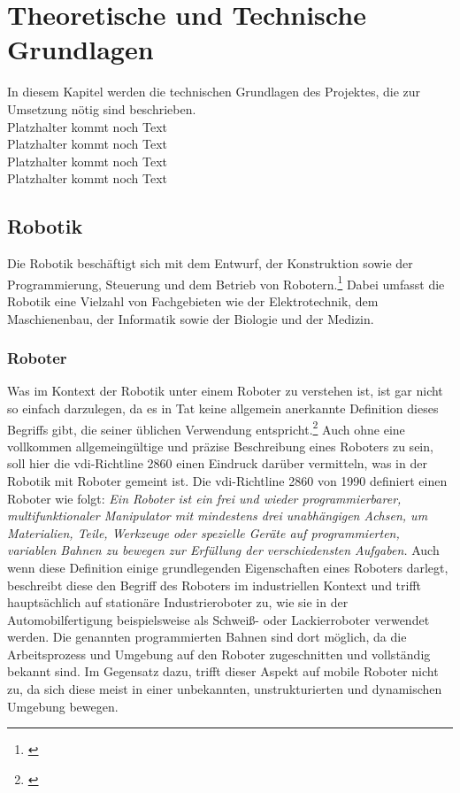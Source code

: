 \section{Theoretische und Technische Grundlagen}
In diesem Kapitel werden die technischen Grundlagen des Projektes, die zur Umsetzung nötig sind beschrieben.
\\Platzhalter kommt noch Text
\\Platzhalter kommt noch Text
\\Platzhalter kommt noch Text
\\Platzhalter kommt noch Text
\subsection{Robotik} %
Die Robotik beschäftigt sich mit dem Entwurf, der Konstruktion sowie der Programmierung, Steuerung und dem Betrieb 
von Robotern.\footnote{\citep[vgl.][Definition Robotik]{Bendel.DefinitionRobotik}\label{note1}} Dabei umfasst die Robotik eine Vielzahl 
von Fachgebieten wie der Elektrotechnik, dem Maschienenbau, der Informatik sowie der Biologie und der Medizin.
\subsubsection{Roboter}
Was im Kontext der Robotik unter einem Roboter zu verstehen ist, ist gar nicht so einfach darzulegen, da es in Tat keine allgemein anerkannte Definition dieses Begriffs gibt, die seiner üblichen Verwendung entspricht.\footnote{\citep[vgl.][Mobile Roboter, Seite 2]{Hertzberg.MobileRoboter}\label{note2}}
\newline
Auch ohne eine vollkommen allgemeingültige und präzise Beschreibung eines Roboters zu sein, soll hier die \gls{vdi}-Richtline 2860 einen Eindruck darüber vermitteln, was in der Robotik mit Roboter gemeint ist. \newline
Die \gls{vdi}-Richtline 2860 von 1990 definiert einen Roboter wie folgt:
\vspace{2mm}
\newline
\glqq{}\textit{Ein Roboter ist ein frei und wieder programmierbarer, multifunktionaler Manipulator mit mindestens drei unabhängigen Achsen, um Materialien, Teile, Werkzeuge oder spezielle Geräte auf programmierten,
variablen Bahnen zu bewegen zur Erfüllung der verschiedensten Aufgaben.}\grqq{}
\vspace{2mm}
\newline
Auch wenn diese Definition einige grundlegenden Eigenschaften eines Roboters darlegt, beschreibt diese den Begriff des Roboters im industriellen Kontext und trifft hauptsächlich auf stationäre Industrieroboter zu, wie sie in der Automobilfertigung beispielsweise als Schweiß- oder Lackierroboter verwendet werden. Die genannten programmierten Bahnen sind dort möglich, da die Arbeitsprozess und Umgebung auf den Roboter zugeschnitten und vollständig bekannt sind. \newline
Im Gegensatz dazu, trifft dieser Aspekt auf mobile Roboter nicht zu, da sich diese meist in einer unbekannten, unstrukturierten und dynamischen Umgebung bewegen.

